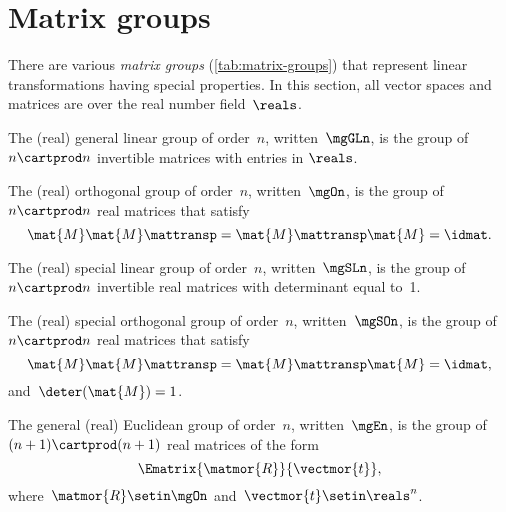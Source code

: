 
\section{Matrix groups}
\label{sec:matrix-grps}


There are various \emph{matrix groups} (\cref{tab:matrix-groups}) that represent linear transformations having special properties.
In this section, all vector spaces and matrices are over the real number field~$\reals$.

\begin{definition}
    \label{def:general-linear-group}
    The (real) general linear group of order~$n$, written~$\mgGLn$, is the group of $n\cartprod n$ invertible matrices with entries in $\reals$.
\end{definition}

\begin{definition}
    \label{def:general-orthogonal-group}
    The (real) orthogonal group of order~$n$, written~$\mgOn$, is the group of~$n\cartprod n$  real matrices that satisfy
    \begin{equation*}
        \mat{M} \mat{M}\mattransp = \mat{M}\mattransp \mat{M} = \idmat.
    \end{equation*}
\end{definition}

\begin{definition}
    \label{def:special-linear-group}
    The (real) special linear group of order~$n$, written~$\mgSLn$, is the group of~$n\cartprod n$ invertible real matrices with determinant equal to~1.
\end{definition}
\begin{definition}
    \label{def:special-orthogonal-group}
    The (real) special orthogonal group of order~$n$, written~$\mgSOn$, is the group of~$n\cartprod n$ real matrices that satisfy
    \begin{equation*}
        \mat{M} \mat{M}\mattransp = \mat{M}\mattransp \mat{M} = \idmat,
    \end{equation*}
    and~$\deter(\mat{M}) = 1$.
\end{definition}

\begin{definition}
    \label{def:general-euclidean-group}
    The general (real) Euclidean group of order~$n$, written~$\mgEn$, is the group of~$(n+1)\cartprod (n+1)$ real matrices of the form
    \begin{equation}
        \label{eq:En-def}
        \Ematrix{\matmor{R}}{\vectmor{t}},
    \end{equation}
    where~$\matmor{R}\setin \mgOn$ and~$\vectmor{t} \setin \reals^n$.
\end{definition}

